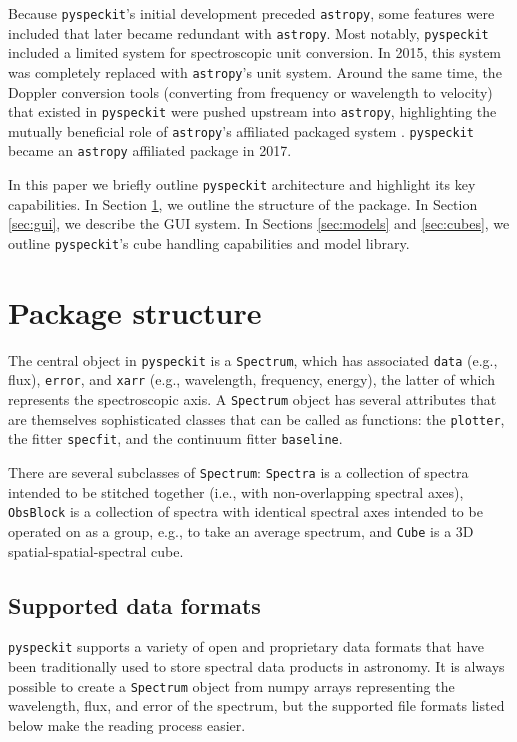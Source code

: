 \documentclass[twocolumn]{aastex63}
\newcommand{\pyspeckit}{\texttt{pyspeckit}\xspace}
\newcommand{\astropy}{\texttt{astropy}\xspace}
\begin{document}
Because \pyspeckit's initial development preceded \astropy, some features
were included that later became redundant with \astropy.  Most notably, \pyspeckit included
a limited system for spectroscopic unit conversion.  In 2015, this system
was completely replaced with \astropy's unit system.  Around the same time,
the Doppler conversion tools (converting from frequency or wavelength to
velocity) that existed in \pyspeckit were pushed upstream into \astropy,
highlighting the mutually beneficial role of \astropy's affiliated
packaged system \citep{AstropyCollaboration2018}.  \pyspeckit became
an \astropy affiliated package in 2017.


In this paper we briefly outline \texttt{pyspeckit} architecture and highlight
its key capabilities. In Section \ref{sec:basicstructure}, we  outline the
structure of the package.  In Section \ref{sec:gui}, we describe the GUI
system.  In Sections \ref{sec:models} and \ref{sec:cubes}, we outline
\pyspeckit's cube handling capabilities and model library. 



\section{Package structure}
\label{sec:basicstructure}
The central object in \pyspeckit is a \texttt{Spectrum}, which has
associated \texttt{data} (e.g., flux), \texttt{error}, and \texttt{xarr} (e.g., wavelength,
frequency, energy), the latter of
which represents the spectroscopic axis.  A \texttt{Spectrum} object has
several attributes that are themselves sophisticated classes that can be called
as functions: the \texttt{plotter}, the fitter \texttt{specfit}, and the
continuum fitter \texttt{baseline}.

There are several subclasses of \texttt{Spectrum}: \texttt{Spectra}
is a collection of spectra intended to be stitched together (i.e., with
non-overlapping spectral axes), \texttt{ObsBlock} is a collection of spectra
with identical spectral axes intended to be operated on as a group, e.g., to
take an average spectrum, and \texttt{Cube} is a 3D spatial-spatial-spectral
cube.

\subsection{Supported data formats}

\pyspeckit supports a variety of open and proprietary data formats that have
been traditionally used to store spectral data products in astronomy. 
It is always possible to create a \texttt{Spectrum} object from numpy arrays
representing the wavelength, flux, and error of the spectrum, but
the supported file formats listed below make the reading process easier.
\end{document}
